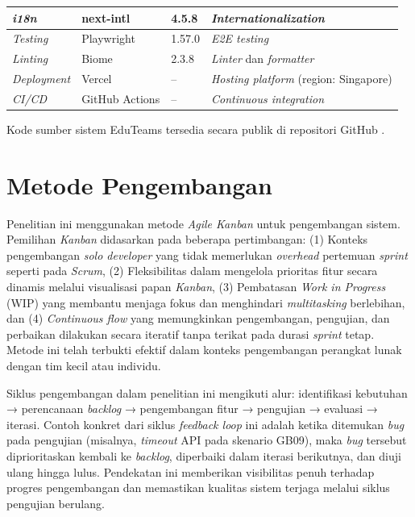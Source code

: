 \begin{longtable}{|p{}|p{}|p{}|p{}|}
	\hline
	\textit{i18n}             & next-intl            & 4.5.8          & \textit{Internationalization}                            \\
	\hline
	\textit{Testing}          & Playwright           & 1.57.0         & \textit{E2E testing}                                     \\
	\hline
	\textit{Linting}          & Biome                & 2.3.8          & \textit{Linter} dan \textit{formatter}                   \\
	\hline
	\textit{Deployment}       & Vercel               & --             & \textit{Hosting platform} (region: Singapore)            \\
	\hline
	\textit{CI/CD}            & GitHub Actions       & --             & \textit{Continuous integration}                          \\
	\hline
\end{longtable}

Kode sumber sistem EduTeams tersedia secara publik di repositori GitHub \cite{EduTeamsRepo2025}.

\section{Metode Pengembangan} \label{III.Metode}

Penelitian ini menggunakan metode \textit{Agile Kanban} untuk pengembangan sistem. Pemilihan \textit{Kanban} didasarkan pada beberapa pertimbangan: (1) Konteks pengembangan \textit{solo developer} yang tidak memerlukan \textit{overhead} pertemuan \textit{sprint} seperti pada \textit{Scrum}, (2) Fleksibilitas dalam mengelola prioritas fitur secara dinamis melalui visualisasi papan \textit{Kanban}, (3) Pembatasan \textit{Work in Progress} (WIP) yang membantu menjaga fokus dan menghindari \textit{multitasking} berlebihan, dan (4) \textit{Continuous flow} yang memungkinkan pengembangan, pengujian, dan perbaikan dilakukan secara iteratif tanpa terikat pada durasi \textit{sprint} tetap. Metode ini telah terbukti efektif dalam konteks pengembangan perangkat lunak dengan tim kecil atau individu. \par

Siklus pengembangan dalam penelitian ini mengikuti alur: identifikasi kebutuhan → perencanaan \textit{backlog} → pengembangan fitur → pengujian → evaluasi → iterasi. Contoh konkret dari siklus \textit{feedback loop} ini adalah ketika ditemukan \textit{bug} pada pengujian (misalnya, \textit{timeout} API pada skenario GB09), maka \textit{bug} tersebut diprioritaskan kembali ke \textit{backlog}, diperbaiki dalam iterasi berikutnya, dan diuji ulang hingga lulus. Pendekatan ini memberikan visibilitas penuh terhadap progres pengembangan dan memastikan kualitas sistem terjaga melalui siklus pengujian berulang. \par

